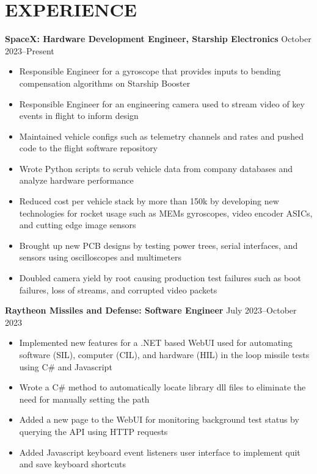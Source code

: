 \documentclass{article}
\begin{document}
\section{EXPERIENCE}
\textbf{SpaceX: Hardware Development Engineer, Starship Electronics}
\hfill
\vspace{0.5em}
October 2023--Present
\begin{itemize}
\item{ Responsible Engineer for a gyroscope that provides inputs to bending compensation algorithms on Starship Booster }
\item{ Responsible Engineer for an engineering camera used to stream video of key events in flight to inform design }
\item{ Maintained vehicle configs such as telemetry channels and rates and pushed code to the flight software repository}
\item{ Wrote Python scripts to scrub vehicle data from company databases and analyze hardware performance }
\item{ Reduced cost per vehicle stack by more than 150k by developing new technologies for rocket usage such as MEMs gyroscopes, video encoder ASICs, and cutting edge image sensors }
\item{ Brought up new PCB designs by testing power trees, serial interfaces, and sensors using oscilloscopes and multimeters }
\item{ Doubled camera yield by root causing production test failures such as boot failures, loss of streams, and corrupted video packets}
\end{itemize}
\vspace{1em}
\textbf{Raytheon Missiles and Defense: Software Engineer}
\hfill
\vspace{0.5em}
July 2023--October 2023
\begin{itemize}
\item{Implemented new features for a .NET based WebUI used for automating software (SIL), computer (CIL), and hardware (HIL) in the loop missile tests using C\# and Javascript}
\item{Wrote a C\# method to automatically locate library dll files to eliminate the need for manually setting the path}
\item{Added a new page to the WebUI for monitoring background test status by querying the API using HTTP requests}
\item{Added Javascript keyboard event listeners user interface to implement quit and save keyboard shortcuts}
\end{itemize}
\end{document}
